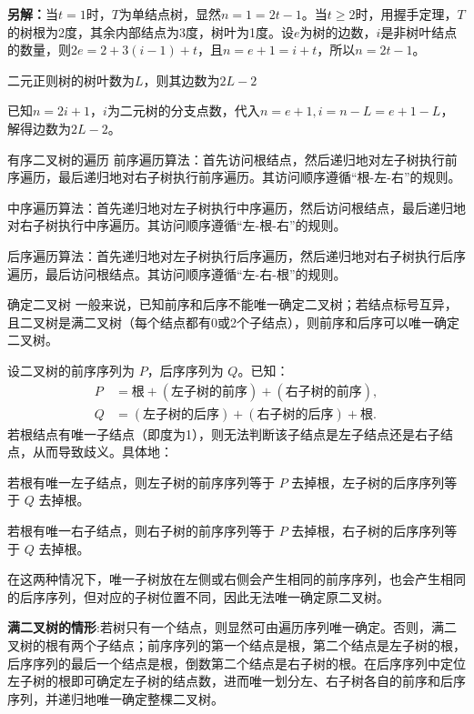 \documentclass[lang=cn,11pt]{elegantbook}
\begin{document}
\textbf{另解：}当$t=1$时，$T$为单结点树，显然$n=1=2t-1$。当$t\geqslant 2$时，用握手定理，$T$的树根为2度，其余内部结点为3度，树叶为1度。设$e$为树的边数，$i$是非树叶结点的数量，则$2e=2+3(i-1)+t$，且$n=e+1=i+t$，所以$n=2t-1$。
\begin{example}
    二元正则树的树叶数为$L$，则其边数为$2L-2$
\end{example}
已知$n=2i+1$，$i$为二元树的分支点数，代入$n=e+1,i=n-L=e+1-L$，解得边数为$2L-2$。
\begin{definition}{有序二叉树的遍历}
前序遍历算法：首先访问根结点，然后递归地对左子树执行前序遍历，最后递归地对右子树执行前序遍历。其访问顺序遵循“根-左-右”的规则。

中序遍历算法：首先递归地对左子树执行中序遍历，然后访问根结点，最后递归地对右子树执行中序遍历。其访问顺序遵循“左-根-右”的规则。

后序遍历算法：首先递归地对左子树执行后序遍历，然后递归地对右子树执行后序遍历，最后访问根结点。其访问顺序遵循“左-右-根”的规则。
\end{definition}
\begin{theorem}{确定二叉树}
    一般来说，已知前序和后序不能唯一确定二叉树；若结点标号互异，且二叉树是满二叉树（每个结点都有0或2个子结点），则前序和后序可以唯一确定二叉树。
\end{theorem}
设二叉树的前序序列为 $P$，后序序列为 $Q$。已知：
    \begin{align*}
        P &= \text{根} + (\text{左子树的前序}) + (\text{右子树的前序}), \\
        Q &= (\text{左子树的后序}) + (\text{右子树的后序}) + \text{根}.
    \end{align*}
    若根结点有唯一子结点（即度为1），则无法判断该子结点是左子结点还是右子结点，从而导致歧义。具体地：
 
    若根有唯一左子结点，则左子树的前序序列等于 $P$ 去掉根，左子树的后序序列等于 $Q$ 去掉根。
      
    若根有唯一右子结点，则右子树的前序序列等于 $P$ 去掉根，右子树的后序序列等于 $Q$ 去掉根。
    
    在这两种情况下，唯一子树放在左侧或右侧会产生相同的前序序列，也会产生相同的后序序列，但对应的子树位置不同，因此无法唯一确定原二叉树。

    \textbf{ 满二叉树的情形}:若树只有一个结点，则显然可由遍历序列唯一确定。否则，满二叉树的根有两个子结点；前序序列的第一个结点是根，第二个结点是左子树的根，后序序列的最后一个结点是根，倒数第二个结点是右子树的根。在后序序列中定位左子树的根即可确定左子树的结点数，进而唯一划分左、右子树各自的前序和后序序列，并递归地唯一确定整棵二叉树。
\end{document}
